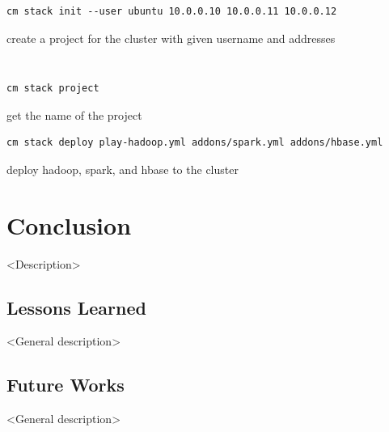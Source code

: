 \begin{Verbatim}[fontfamily=helvetica]
cm stack init --user ubuntu 10.0.0.10 10.0.0.11 10.0.0.12
\end{Verbatim}

create a project for the cluster with given username and addresses


\begin{Verbatim}[fontfamily=helvetica]

\end{Verbatim}

\begin{Verbatim}[fontfamily=helvetica]

\end{Verbatim}

\begin{Verbatim}[fontfamily=helvetica]
cm stack project
\end{Verbatim}

get the name of the project

\begin{Verbatim}[fontfamily=helvetica]
cm stack deploy play-hadoop.yml addons/spark.yml addons/hbase.yml
\end{Verbatim}

deploy hadoop, spark, and hbase to the cluster



\section{Conclusion}

<Description> 

\subsection{Lessons Learned}

<General description>

\subsection{Future Works}


<General description>

\newpage




